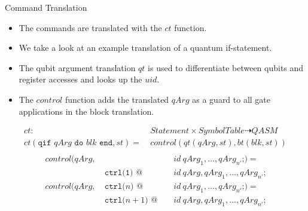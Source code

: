 \begin{frame}{Command Translation}
    \begin{itemize}
        \item The commands are translated with the $ct$ function.
        \item We take a look at an example translation of a quantum if-statement.
        \item The qubit argument translation $qt$ is used to differentiate between qubits and register accesses and looks up the $uid$.
        \item The $control$ function adds the translated $qArg$ as a guard to all gate applications in the block translation.  
    \end{itemize}
    \begin{align*}
        ct : \ & Statement \times SymbolTable \dashrightarrow QASM \\        
        ct(\texttt{qif } qArg \texttt{ do } blk \texttt{ end}, st) = \ &  control(qt(qArg, st), bt(blk, st)) \\
    \end{align*}
    \vspace{\alignmargin}
    \begin{align*}
        control(qArg, &&&  id \ qArg_1, \dots, qArg_{n'} \texttt{;}) = \\  
        & \ \texttt{ctrl(1) @ } && id \ qArg, qArg_1, \dots, qArg_{n'}\texttt{;}\\
        control(qArg, & \ \texttt{ctrl(}n \texttt{) @ } && id \ qArg_1, \dots, qArg_{n'} \texttt{;}) = \\
        & \ \texttt{ctrl(}n+1 \texttt{) @ } && id \ qArg, qArg_1, \dots, qArg_{n'}\texttt{;}
    \end{align*}
\end{frame}

